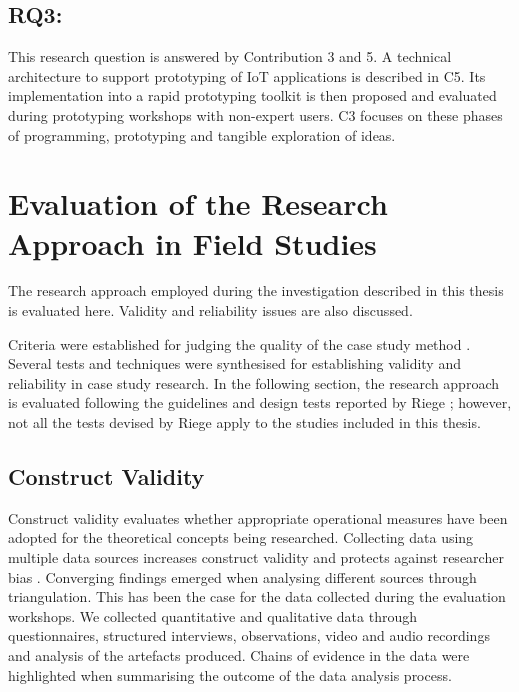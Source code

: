\subsection*{RQ3: \RQiii}
\label{rq3}
This research question is answered by Contribution 3 and 5. A technical architecture to support prototyping of IoT applications is described in C5. Its implementation into a rapid prototyping toolkit is then proposed and evaluated during prototyping workshops with non-expert users. C3 focuses on these phases of programming, prototyping and tangible exploration of ideas.


\section{Evaluation of the Research Approach in Field Studies}
\label{evaluation-of-research-approach}

The research approach employed during the investigation described in this thesis is evaluated here. Validity and reliability issues \autocites{yin_case_2017}{riege_validity_2003} are also discussed.

Criteria were established for judging the quality of the case study method \autocite{riege_validity_2003}. Several tests and techniques were synthesised for establishing validity and reliability in case study research.
In the following section, the research approach is evaluated following the guidelines and design tests reported by Riege \autocite*{riege_validity_2003}; however, not all the tests devised by Riege apply to the studies included in this thesis.

\subsection{Construct Validity}
\label{construct-validity}
Construct validity evaluates whether appropriate operational measures have been adopted for the theoretical concepts being researched.
Collecting data using multiple data sources increases construct validity and protects against researcher bias \autocites{perakyla_reliability_1998}{flick_triangulation_1992}. Converging findings emerged when analysing different sources through triangulation. This has been the case for the data collected during the evaluation workshops. We collected quantitative and qualitative data through questionnaires, structured interviews, observations, video and audio recordings and analysis of the artefacts produced. Chains of evidence in the data \autocites{griggs_analysing_1987}{hirschman_humanistic_1986} were highlighted when summarising the outcome of the data analysis process.

